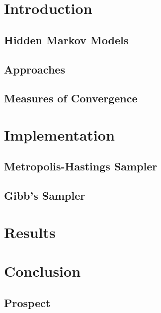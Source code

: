 
\chapter{Introduction}
	\section{Hidden Markov Models}
		
		
	\section{Approaches}
		
		
	\section{Measures of Convergence}
		

\chapter{Implementation}
	
	\section{Metropolis-Hastings Sampler}
		
	\section{Gibb's Sampler}
		

\chapter{Results}
	

\chapter{Conclusion}
\section{Prospect}